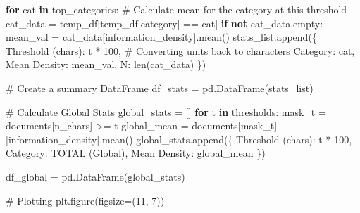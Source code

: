 \documentclass[
  italian,
  a4paper,
]{article}
\newenvironment{Shaded}{\begin{snugshade}}{\end{snugshade}}
\newcommand{\BuiltInTok}[1]{\textcolor[rgb]{0.00,0.23,0.31}{#1}}
\newcommand{\CommentTok}[1]{\textcolor[rgb]{0.37,0.37,0.37}{#1}}
\newcommand{\ControlFlowTok}[1]{\textcolor[rgb]{0.00,0.23,0.31}{\textbf{#1}}}
\newcommand{\DecValTok}[1]{\textcolor[rgb]{0.68,0.00,0.00}{#1}}
\newcommand{\KeywordTok}[1]{\textcolor[rgb]{0.00,0.23,0.31}{\textbf{#1}}}
\newcommand{\NormalTok}[1]{\textcolor[rgb]{0.00,0.23,0.31}{#1}}
\newcommand{\OperatorTok}[1]{\textcolor[rgb]{0.37,0.37,0.37}{#1}}
\newcommand{\StringTok}[1]{\textcolor[rgb]{0.13,0.47,0.30}{#1}}
\begin{document}
\begin{Shaded}
\begin{Highlighting}[]
    \ControlFlowTok{for}\NormalTok{ cat }\KeywordTok{in}\NormalTok{ top\_categories:}
        \CommentTok{\# Calculate mean for the category at this threshold}
\NormalTok{        cat\_data }\OperatorTok{=}\NormalTok{ temp\_df[temp\_df[}\StringTok{\textquotesingle{}category\textquotesingle{}}\NormalTok{] }\OperatorTok{==}\NormalTok{ cat]}
        \ControlFlowTok{if} \KeywordTok{not}\NormalTok{ cat\_data.empty:}
\NormalTok{            mean\_val }\OperatorTok{=}\NormalTok{ cat\_data[}\StringTok{\textquotesingle{}information\_density\textquotesingle{}}\NormalTok{].mean()}
\NormalTok{            stats\_list.append(\{}
                \StringTok{\textquotesingle{}Threshold (chars)\textquotesingle{}}\NormalTok{: t }\OperatorTok{*} \DecValTok{100}\NormalTok{, }\CommentTok{\# Converting units back to characters}
                \StringTok{\textquotesingle{}Category\textquotesingle{}}\NormalTok{: cat,}
                \StringTok{\textquotesingle{}Mean Density\textquotesingle{}}\NormalTok{: mean\_val,}
                \StringTok{\textquotesingle{}N\textquotesingle{}}\NormalTok{: }\BuiltInTok{len}\NormalTok{(cat\_data)}
\NormalTok{            \})}

\CommentTok{\# Create a summary DataFrame}
\NormalTok{df\_stats }\OperatorTok{=}\NormalTok{ pd.DataFrame(stats\_list)}

 \CommentTok{\# Calculate Global Stats}
\NormalTok{global\_stats }\OperatorTok{=}\NormalTok{ []}
\ControlFlowTok{for}\NormalTok{ t }\KeywordTok{in}\NormalTok{ thresholds:}
\NormalTok{    mask\_t }\OperatorTok{=}\NormalTok{ documents[}\StringTok{\textquotesingle{}n\_chars\textquotesingle{}}\NormalTok{] }\OperatorTok{\textgreater{}=}\NormalTok{ t}
\NormalTok{    global\_mean }\OperatorTok{=}\NormalTok{ documents[mask\_t][}\StringTok{\textquotesingle{}information\_density\textquotesingle{}}\NormalTok{].mean()}
\NormalTok{    global\_stats.append(\{}
        \StringTok{\textquotesingle{}Threshold (chars)\textquotesingle{}}\NormalTok{: t }\OperatorTok{*} \DecValTok{100}\NormalTok{,}
        \StringTok{\textquotesingle{}Category\textquotesingle{}}\NormalTok{: }\StringTok{\textquotesingle{}TOTAL (Global)\textquotesingle{}}\NormalTok{,}
        \StringTok{\textquotesingle{}Mean Density\textquotesingle{}}\NormalTok{: global\_mean}
\NormalTok{    \})}

\NormalTok{df\_global }\OperatorTok{=}\NormalTok{ pd.DataFrame(global\_stats)}

\CommentTok{\# Plotting}
\NormalTok{plt.figure(figsize}\OperatorTok{=}\NormalTok{(}\DecValTok{11}\NormalTok{, }\DecValTok{7}\NormalTok{))}


\end{Highlighting}
\end{Shaded}
\end{document}
